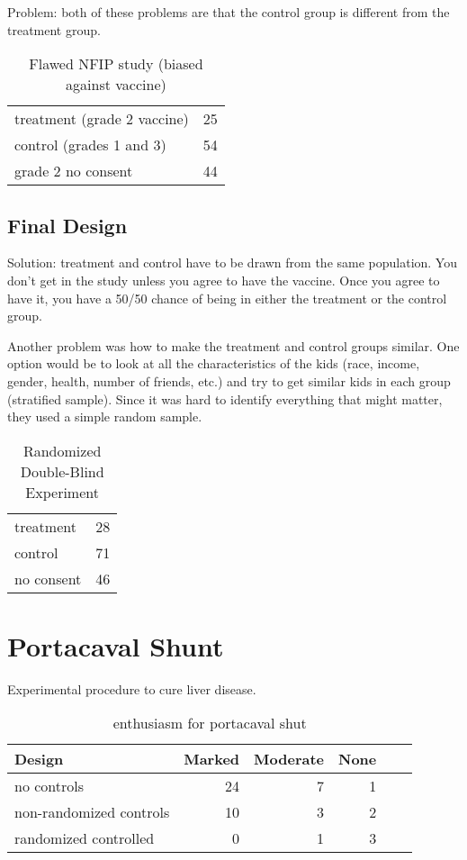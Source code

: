 \documentclass[landscape]{exam}
\begin{document}
  Problem: both of these problems are that the control group is different from the
  treatment group.

  \begin{table}
    \centering
    \begin{tabular}{lr}
      \toprule
      treatment (grade 2 vaccine) & 25 \\
      control (grades 1 and 3)    & 54 \\
      grade 2 no consent          & 44 \\
      \bottomrule
    \end{tabular}
    \caption{Flawed NFIP study (biased against vaccine)}\label{tab:polio.1}
  \end{table}

  \subsection{Final Design}
  Solution: treatment and control have to be drawn from the same population. You
  don't get in the study unless you agree to have the vaccine. Once you agree to
  have it, you have a 50/50 chance of being in either the treatment or the
  control group.

  Another problem was how to make the treatment and control groups similar.  One
  option would be to look at all the characteristics of the kids (race, income,
  gender, health, number of friends, etc.) and try to get similar kids in each
  group (stratified sample).  Since it was hard to identify everything that
  might matter, they used a simple random sample.

  \begin{table}
    \centering
    \begin{tabular}{lr}
      \toprule
      treatment  & 28 \\
      control    & 71 \\
      no consent & 46 \\
      \bottomrule
    \end{tabular}
    \caption{Randomized Double-Blind Experiment}\label{tab:polio.1}
  \end{table}

  \section{Portacaval Shunt}

  Experimental procedure to cure liver disease.

  \begin{table}[H]
    \centering
    \begin{tabular}{lrrrrr}
      \toprule
      Design                  & Marked & Moderate & None \\
      \midrule
      no controls             & 24     & 7        & 1   \\
      non-randomized controls & 10     & 3        & 2   \\
      randomized controlled   & 0      & 1        & 3   \\
      \bottomrule
    \end{tabular}
    \caption{enthusiasm for portacaval shut}\label{tab:shunt}
  \end{table}
\end{document}
